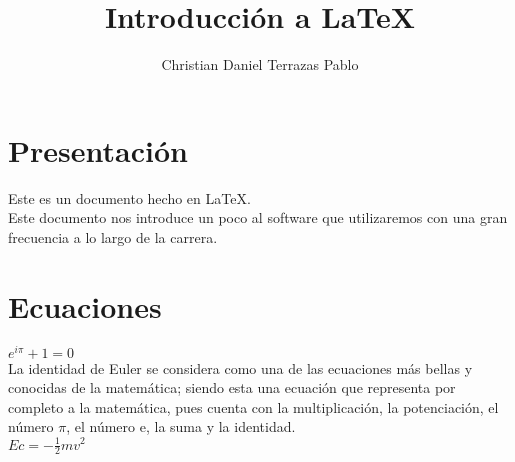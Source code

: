\documentclass[a4paper,10pt]{article}
\title{Introducción a \LaTeX}
\author{Christian Daniel Terrazas Pablo}
\begin{document}
\maketitle

% 

\section{Presentación}

Este es un documento hecho en \LaTeX . \\

Este documento nos introduce un poco al software que utilizaremos con una gran frecuencia a lo largo de la carrera.

\section{Ecuaciones}
$ e^{i \pi} + 1 = 0 $  \\ %

La identidad de Euler se considera como una de las ecuaciones más bellas y conocidas de la matemática; siendo esta una ecuación que representa por completo a la matemática, pues cuenta con la multiplicación, la potenciación, el número $\pi$, el número e, la suma y la identidad. \\

$Ec = -\frac{1}{2}mv^2$
\end{document}
